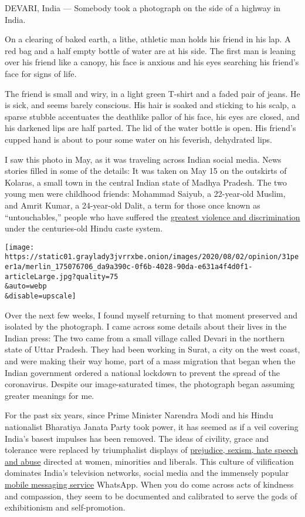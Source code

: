 DEVARI, India --- Somebody took a photograph on the side of a highway in
India.

On a clearing of baked earth, a lithe, athletic man holds his friend in
his lap. A red bag and a half empty bottle of water are at his side. The
first man is leaning over his friend like a canopy, his face is anxious
and his eyes searching his friend's face for signs of life.

The friend is small and wiry, in a light green T-shirt and a faded pair
of jeans. He is sick, and seems barely conscious. His hair is soaked and
sticking to his scalp, a sparse stubble accentuates the deathlike pallor
of his face, his eyes are closed, and his darkened lips are half parted.
The lid of the water bottle is open. His friend's cupped hand is about
to pour some water on his feverish, dehydrated lips.

I saw this photo in May, as it was traveling across Indian social media.
News stories filled in some of the details: It was taken on May 15 on
the outskirts of Kolaras, a small town in the central Indian state of
Madhya Pradesh. The two young men were childhood friends: Mohammad
Saiyub, a 22-year-old Muslim, and Amrit Kumar, a 24-year-old Dalit, a
term for those once known as ``untouchables,'' people who have suffered
the
\href{https://www.nytimes3xbfgragh.onion/2020/07/14/opinion/caste-cisco-indian-americans-discrimination.html}{greatest
violence and discrimination} under the centuries-old Hindu caste system.

\texttt{[image: https://static01.graylady3jvrrxbe.onion/images/2020/08/02/opinion/31peer1a/merlin\_175076706\_da9a390c-0f6b-4028-90da-e631a4f4d0f1-articleLarge.jpg?quality=75\\\&auto=webp\\\&disable=upscale]}

Over the next few weeks, I found myself returning to that moment
preserved and isolated by the photograph. I came across some details
about their lives in the Indian press: The two came from a small village
called Devari in the northern state of Uttar Pradesh. They had been
working in Surat, a city on the west coast, and were making their way
home, part of a mass migration that began when the Indian government
ordered a national lockdown to prevent the spread of the coronavirus.
Despite our image-saturated times, the photograph began assuming greater
meanings for me.

For the past six years, since Prime Minister Narendra Modi and his Hindu
nationalist Bharatiya Janata Party took power, it has seemed as if a
veil covering India's basest impulses has been removed. The ideas of
civility, grace and tolerance were replaced by triumphalist displays of
\href{https://www.orfonline.org/research/43665-digital-hatred-real-violence-majoritarian-radicalisation-and-social-media-in-india/}{prejudice,
sexism, hate speech and abuse} directed at women, minorities and
liberals. This culture of vilification dominates India's television
networks, social media and the immensely popular
\href{https://www.wired.com/story/indias-frightening-descent-social-media-terror/}{mobile
messaging service} WhatsApp. When you do come across acts of kindness
and compassion, they seem to be documented and calibrated to serve the
gods of exhibitionism and self-promotion.

